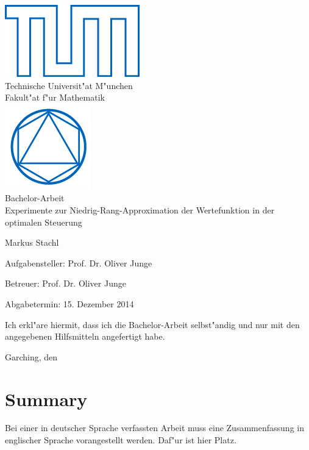 \documentclass[12pt,a4paper,twoside]{article}
\begin{document}
\pagestyle{empty}
\begin{titlepage}
\begin{center}
\includegraphics{TUMblau.png}\\[3mm]
\sf
{\Large
  Technische Universit"at M"unchen\\[5mm]
  Fakult"at f"ur Mathematik\\[8mm]
}
\normalsize
\includegraphics{MA_Web.png}\\[15mm]

Bachelor-Arbeit\\[15mm]

{\LARGE
Experimente zur Niedrig-Rang-Approximation der Wertefunktion in der optimalen Steuerung
}
\bigskip

\normalsize

Markus Stachl
\end{center}
\vspace*{75mm}

Aufgabensteller: Prof. Dr. Oliver Junge
\medskip

Betreuer: Prof. Dr. Oliver Junge
\medskip

Abgabetermin: 15. Dezember 2014

\end{titlepage}

\vspace*{150mm}

Ich erkl"are hiermit, dass ich die Bachelor-Arbeit selbst"andig und nur mit den angegebenen
Hilfsmitteln angefertigt habe.
\bigskip

Garching, den
\newpage
\section*{Summary}
Bei einer in deutscher Sprache verfassten Arbeit muss eine Zusammenfassung in englischer Sprache vorangestellt werden.
Daf"ur ist hier Platz.
\end{document}
